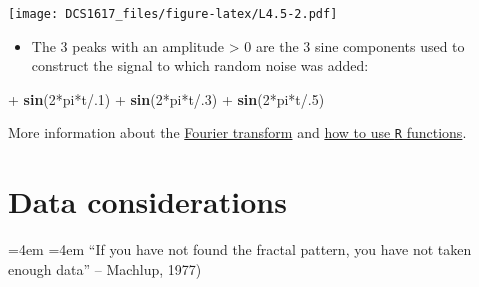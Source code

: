 \documentclass[]{book}
\newenvironment{Shaded}{\begin{snugshade}}{\end{snugshade}}
\newcommand{\KeywordTok}[1]{\textcolor[rgb]{0.13,0.29,0.53}{\textbf{{#1}}}}
\newcommand{\DecValTok}[1]{\textcolor[rgb]{0.00,0.00,0.81}{{#1}}}
\newcommand{\StringTok}[1]{\textcolor[rgb]{0.31,0.60,0.02}{{#1}}}
\newcommand{\NormalTok}[1]{{#1}}
\providecommand{\tightlist}{%
  \setlength{\itemsep}{0pt}\setlength{\parskip}{0pt}}
\renewenvironment{quote}{%
  \par \small \medskip \block
  \leftskip=4em \rightskip=4em%
  \noindent \ignorespaces}{%
  \par \medskip
  }
\let\stdsection\section
\renewcommand\section{\newpage\stdsection}
\begin{document}
\texttt{[image: DCS1617\_files/figure-latex/L4.5-2.pdf]}

\begin{itemize}
\tightlist
\item
  The \(3\) peaks with an amplitude \textgreater{} \(0\) are the \(3\)
  sine components used to construct the signal to which random noise was
  added:
\end{itemize}

\begin{Shaded}
\begin{Highlighting}[]
\NormalTok{+}\StringTok{ }\KeywordTok{sin}\NormalTok{(}\DecValTok{2}\NormalTok{*pi*t/.}\DecValTok{1}\NormalTok{) }
\NormalTok{+}\StringTok{ }\KeywordTok{sin}\NormalTok{(}\DecValTok{2}\NormalTok{*pi*t/.}\DecValTok{3}\NormalTok{) }
\NormalTok{+}\StringTok{ }\KeywordTok{sin}\NormalTok{(}\DecValTok{2}\NormalTok{*pi*t/.}\DecValTok{5}\NormalTok{)}
\end{Highlighting}
\end{Shaded}

More information about the
\href{https://en.wikipedia.org/wiki/Fourier_transform}{Fourier
transform} and
\href{http://www.di.fc.ul.pt/~jpn/r/fourier/fourier.html}{how to use
\texttt{R} functions}.

\hypertarget{data-considerations}{\section*{Data
considerations}\label{data-considerations}}

\begin{quote}
``If you have not found the fractal pattern, you have not taken enough
data'' -- Machlup, 1977)
\end{quote}
\end{document}
